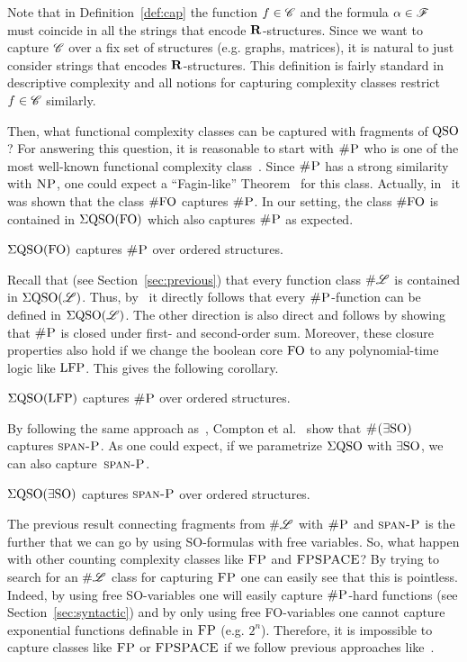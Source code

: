 Note that in Definition~\ref{def:cap} the function $f \in \mathscr{C}$ and the formula $\alpha \in \mathscr{F}$ must coincide in all the strings that encode $\mathbf{R}$-structures. Since we want to capture $\mathscr{C}$ over a fix set of structures (e.g. graphs, matrices), it is natural to just consider strings that encodes $\mathbf{R}$-structures. 
This definition is fairly standard in descriptive complexity \cite{L04,immerman2012descriptive} and all notions for capturing complexity classes restrict $f \in \mathscr{C}$ similarly. 

Then, what functional complexity classes can be captured with fragments of ${\rm QSO}$?
For answering this question, it is reasonable to start with $\text{\sc \#P}$ who is one of the most well-known functional complexity class~\cite{arora2009computational}. 
Since $\text{\sc \#P}$ has a strong similarity with $\text{\sc NP}$, one could expect a ``Fagin-like'' Theorem~\cite{fagin1974generalized} for this class. 
Actually, in~\cite{SalujaST95} it was shown that the class $\#{\rm FO}$ captures $\text{\sc \#P}$.
In our setting, the class $\#{\rm FO}$ is contained in $\Sigma{\rm QSO}({\rm FO})$ which also captures $\text{\sc \#P}$ as expected. 
\begin{proposition} \label{prop:capture-shP}
	$\Sigma{\rm QSO}({\rm FO})$ captures $\text{\sc \#P}$ over ordered structures.
\end{proposition}
Recall that (see Section~\ref{sec:previous}) that every function class $\# \mathscr{L}$ is contained in $\Sigma{\rm QSO}(\mathscr{L})$. Thus, by~\cite{SalujaST95} it directly follows that every $\text{\sc \#P}$-function can be defined in $\Sigma{\rm QSO}(\mathscr{L})$. The other direction is also direct and follows by showing that $\text{\sc \#P}$ is closed under first- and second-order sum.
Moreover, these closure properties also hold if we change the boolean core ${\rm FO}$ to any polynomial-time logic like ${\rm LFP}$. This gives the following corollary.
\begin{corollary} \label{prop:capture-shP-LFP}
	$\Sigma{\rm QSO}({\rm LFP})$ captures $\text{\sc \#P}$ over ordered structures.
\end{corollary}
By following the same approach as~\cite{SalujaST95}, Compton et al.~\cite{ComptonG96} show that $\text{\sc \#($\exists{\rm SO}$)}$ captures $\text{\sc span-P}$. As one could expect, if we parametrize $\Sigma{\rm QSO}$ with $\exists{\rm SO}$, we can also capture~$\text{\sc span-P}$.
\begin{proposition} \label{prop:capture-spanP}
	$\Sigma{\rm QSO}(\exists{\rm SO})$ captures $\text{\sc span-P}$ over ordered structures.
\end{proposition}
The previous result connecting fragments from $\# \mathscr{L}$ with $\text{\sc \#P}$ and $\text{\sc span-P}$ is the further that we can go by using SO-formulas with free variables. 
So, what happen with other counting complexity classes like $\text{\sc FP}$ and $\text{\sc FPSPACE}$?
By trying to search for an $\# \mathscr{L}$ class for capturing $\text{\sc FP}$ one can easily see that this is pointless.
Indeed, by using free SO-variables one will easily capture $\text{\sc \#P}$-hard functions (see Section~\ref{sec:syntactic}) and by only using free FO-variables one cannot capture exponential functions definable in $\text{\sc FP}$ (e.g. $2^{n}$).
Therefore, it is impossible to capture classes like $\text{\sc FP}$ or $\text{\sc FPSPACE}$ if we follow previous approaches like~\cite{SalujaST95}. 

